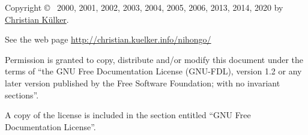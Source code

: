 \footnotesize

Copyright \copyright~ 2000, 2001, 2002, 2003, 2004, 2005, 2006, 2013, 2014,
2020 by
\href{mailto:christian.kuelker@cipworx.org}{Christian K\"ulker}.

\medskip

See the web page
\href{http://christian.kuelker.info/nihongo/}{http://christian.kuelker.info/nihongo/}


Permission is granted to copy, distribute and/or modify this document under the
terms of “the GNU Free Documentation License (GNU-FDL), version 1.2 or any
later version published by the Free Software Foundation; with no invariant
sections”.

A copy of the license is included in the section entitled “GNU Free
Documentation License”.

\normalsize
